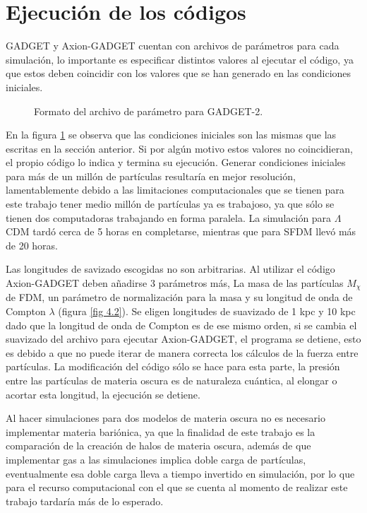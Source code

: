 \documentclass[a4paper,openright,12pt]{book}
\begin{document}
\section{Ejecución de los códigos}
GADGET y Axion-GADGET cuentan con archivos de parámetros para cada simulación, lo importante es especificar distintos valores al ejecutar el código, ya que estos deben coincidir con los valores que se han generado en las condiciones iniciales.
\begin{figure}[]
\centering
{}
\caption{\footnotesize{Formato del archivo de parámetro para GADGET-2.}} \label{fig 4.1}
\end{figure}
En la figura \ref{fig 4.1} se observa que las condiciones iniciales son las mismas que las escritas en la sección anterior. Si por algún motivo estos valores no coincidieran, el propio código lo indica y termina su ejecución. Generar condiciones iniciales para más de un millón de partículas resultaría en mejor resolución, lamentablemente debido a las limitaciones computacionales que se tienen para este trabajo tener medio millón de partículas ya es trabajoso, ya que sólo se tienen dos computadoras trabajando en forma paralela. La simulación para $\Lambda$CDM tardó cerca de 5 horas en completarse, mientras que para SFDM llevó más de 20 horas.

Las longitudes de savizado escogidas no son arbitrarias. Al utilizar el código Axion-GADGET deben añadirse 3 parámetros más, La masa de las partículas $M_{\chi}$ de FDM, un parámetro de normalización para la masa y su longitud de onda de Compton $\lambda$ (figura \ref{fig 4.2}). Se eligen longitudes de suavizado de 1 kpc y 10 kpc dado que la longitud de onda de Compton es de ese mismo orden, si se cambia el suavizado del archivo para ejecutar Axion-GADGET, el programa se detiene, esto es debido a que no puede iterar de manera correcta los cálculos de la fuerza entre partículas. La modificación del código sólo se hace para esta parte, la presión entre las partículas de materia oscura es de naturaleza cuántica, al elongar o acortar esta longitud, la ejecución se detiene.

Al hacer simulaciones para dos modelos de materia oscura no es necesario implementar materia bariónica, ya que la finalidad de este trabajo es la comparación de la creación de halos de materia oscura, además de que implementar gas a las simulaciones implica doble carga de partículas, eventualmente esa doble carga lleva a tiempo invertido en simulación, por lo que para el recurso computacional con el que se cuenta al momento de realizar este trabajo tardaría más de lo esperado.
\end{document}
